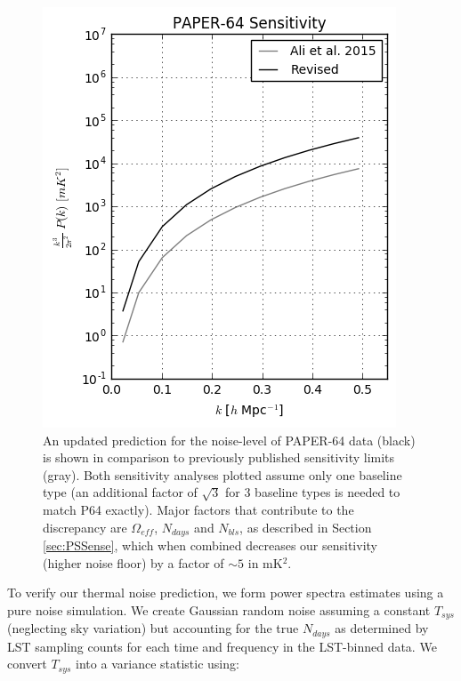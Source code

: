 \documentclass[preprint2,numberedappendix,tighten]{aastex6}  %
\begin{document}
\begin{figure}
	\centering
	\includegraphics[width=\columnwidth]{plots/sense_check.png}
	\caption{An updated prediction for the noise-level of PAPER-64 data (black) is shown in comparison to previously 
published sensitivity limits (gray). Both sensitivity analyses plotted assume only one baseline type (an additional factor of $
\sqrt{3}$ for 3 baseline types is needed to match P64 exactly). Major factors that contribute to the discrepancy are $
\Omega_{eff}$, $N_{days}$ and $N_{bls}$, as described in Section \ref{sec:PSSense}, which when combined decreases our 
sensitivity (higher noise floor) by a factor of $\sim5$ in mK$^{2}$.}
	\label{fig:sense_check}
\end{figure}

To verify our thermal noise prediction, we form power spectra estimates using a pure noise simulation. We create Gaussian 
random noise assuming a constant $T_{sys}$ (neglecting sky variation) but accounting for the true $N_{days}$ as determined 
by LST sampling counts for each time and frequency in the LST-binned data. We convert $T_{sys}$ into a variance statistic 
using:
\end{document}
